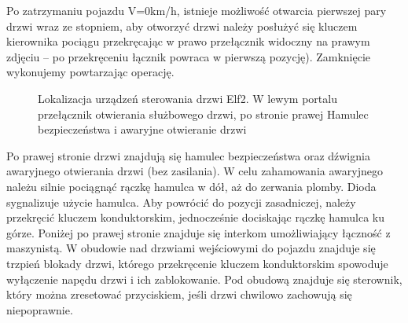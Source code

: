 Po zatrzymaniu pojazdu V=0km/h, istnieje możliwość otwarcia pierwszej pary drzwi wraz ze stopniem, aby otworzyć drzwi należy posłużyć się kluczem kierownika pociągu przekręcając w prawo przełącznik widoczny na prawym zdjęciu – po przekręceniu łącznik powraca w pierwszą pozycję). Zamknięcie wykonujemy powtarzając operację.
	\begin{figure}
		\caption{Lokalizacja urządzeń sterowania drzwi Elf2. W lewym portalu przełącznik otwierania służbowego drzwi, po stronie prawej Hamulec bezpieczeństwa i awaryjne otwieranie drzwi}
	\end{figure}

Po prawej stronie drzwi znajdują się hamulec bezpieczeństwa oraz dźwignia awaryjnego otwierania drzwi (bez zasilania). W celu zahamowania awaryjnego należu silnie pociągnąć rączkę hamulca w dół, aż do zerwania plomby. Dioda sygnalizuje użycie hamulca. Aby powrócić do pozycji zasadniczej, należy przekręcić kluczem konduktorskim, jednocześnie dociskając
rączkę hamulca ku górze. Poniżej po prawej stronie znajduje się interkom umożliwiający łączność z maszynistą.
W obudowie nad drzwiami wejściowymi do pojazdu znajduje się trzpień blokady drzwi, którego przekręcenie kluczem konduktorskim spowoduje wyłączenie napędu drzwi i ich zablokowanie. Pod obudową znajduje się sterownik, który można zresetować przyciskiem, jeśli drzwi chwilowo zachowują się niepoprawnie.

